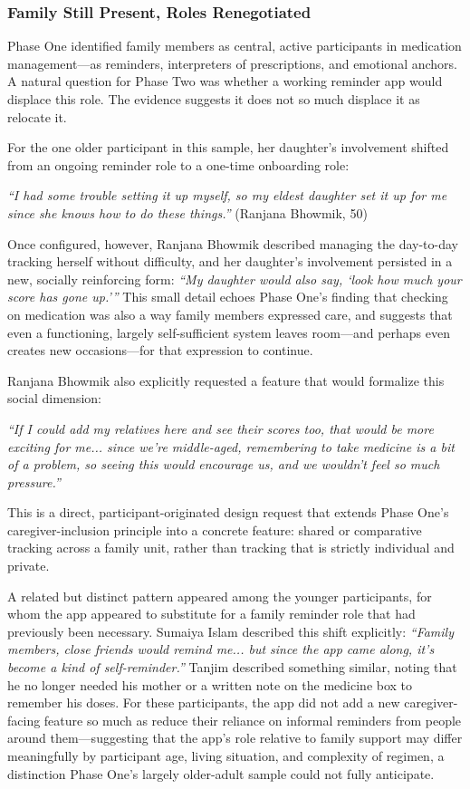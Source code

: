 \documentclass[acmlarge]{acmart}
\begin{document}
\subsubsection{Family Still Present, Roles Renegotiated}
Phase One identified family members as central, active participants in
medication management---as reminders, interpreters of prescriptions, and
emotional anchors. A natural question for Phase Two was whether a working
reminder app would displace this role. The evidence suggests it does not so
much displace it as relocate it.

For the one older participant in this sample, her daughter's involvement
shifted from an ongoing reminder role to a one-time onboarding role:

\emph{``I had some trouble setting it up myself, so my eldest daughter set
it up for me since she knows how to do these things.''} (Ranjana Bhowmik,
50)

Once configured, however, Ranjana Bhowmik described managing the day-to-day
tracking herself without difficulty, and her daughter's involvement
persisted in a new, socially reinforcing form: \emph{``My daughter would
also say, `look how much your score has gone up.'''} This small detail
echoes Phase One's finding that checking on medication was also a way
family members expressed care, and suggests that even a functioning,
largely self-sufficient system leaves room---and perhaps even creates new
occasions---for that expression to continue.

Ranjana Bhowmik also explicitly requested a feature that would formalize
this social dimension:

\emph{``If I could add my relatives here and see their scores too, that
would be more exciting for me... since we're middle-aged, remembering to
take medicine is a bit of a problem, so seeing this would encourage us,
and we wouldn't feel so much pressure.''}

This is a direct, participant-originated design request that extends
Phase One's caregiver-inclusion principle into a concrete feature: shared or
comparative tracking across a family unit, rather than tracking that is
strictly individual and private.

A related but distinct pattern appeared among the younger participants, for
whom the app appeared to substitute for a family reminder role that had
previously been necessary. Sumaiya Islam described this shift explicitly:
\emph{``Family members, close friends would remind me... but since the app
came along, it's become a kind of self-reminder.''} Tanjim described
something similar, noting that he no longer needed his mother or a written
note on the medicine box to remember his doses. For these participants, the
app did not add a new caregiver-facing feature so much as reduce their
reliance on informal reminders from people around them---suggesting that the
app's role relative to family support may differ meaningfully by
participant age, living situation, and complexity of regimen, a distinction
Phase One's largely older-adult sample could not fully anticipate.
\end{document}
